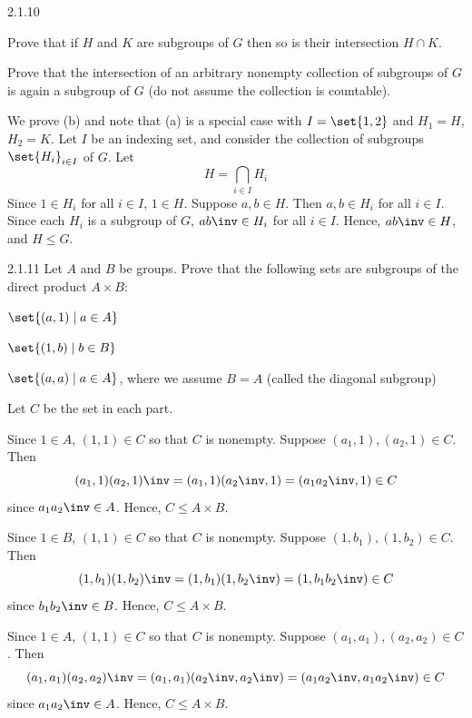 \begin{exercise}{2.1.10}
    \begin{subexercises}
        \item Prove that if $H$ and $K$ are subgroups of $G$ then so is their intersection $H \cap K$.
        \item Prove that the intersection of an arbitrary nonempty collection of subgroups of $G$ is again a subgroup of $G$ (do not assume the collection is countable).
    \end{subexercises}
\end{exercise}

\begin{sol}
    We prove (b) and note that (a) is a special case with $I = \set{1, 2}$ and $H_1 = H$, $H_2 = K$.
	Let $I$ be an indexing set, and consider the collection of subgroups $\set{ H_i }_{i \in I}$ of $G$.
	Let
    \[
    	H = \bigcap_{i \in I} H_i
    \]
    Since $1 \in H_i$ for all $i \in I$, $1 \in H$.
	Suppose $a, b \in H$.
	Then $a, b \in H_i$ for all $i \in I$.
	Since each $H_i$ is a subgroup of $G$, $ab\inv \in H_i$ for all $i \in I$.
	Hence, $ab\inv \in H$, and $H \leq G$.
\end{sol}

\begin{exercise}{2.1.11}
    Let $A$ and $B$ be groups.
	Prove that the following sets are subgroups of the direct product $A \times B$:
    \begin{subexercises}
        \item $\set{ (a, 1) \mid a \in A }$
        \item $\set{ (1, b) \mid b \in B }$
        \item $\set{ (a, a) \mid a \in A }$, where we assume $B = A$ (called the diagonal subgroup)
    \end{subexercises}
\end{exercise}

\begin{sol}
    Let $C$ be the set in each part.
    \begin{subexercises}
        \item Since $1 \in A$, $(1, 1) \in C$ so that $C$ is nonempty.
        Suppose $(a_1, 1), (a_2, 1) \in C$.
        Then
        \[
        	(a_1, 1)(a_2, 1)\inv = (a_1, 1)(a_2\inv, 1) = (a_1a_2\inv, 1) \in C
        \]
        since $a_1a_2\inv \in A$.
        Hence, $C \leq A \times B$.
        \item Since $1 \in B$, $(1, 1) \in C$ so that $C$ is nonempty.
        Suppose $(1, b_1), (1, b_2) \in C$.
        Then
        \[
        	(1, b_1)(1, b_2)\inv = (1, b_1)(1, b_2\inv) = (1, b_1b_2\inv) \in C
        \]
        since $b_1b_2\inv \in B$.
        Hence, $C \leq A \times B$.
        \item Since $1 \in A$, $(1, 1) \in C$ so that $C$ is nonempty.
        Suppose $(a_1, a_1), (a_2, a_2) \in C$.
        Then
        \[
        	(a_1, a_1)(a_2, a_2)\inv = (a_1, a_1)(a_2\inv, a_2\inv) = (a_1a_2\inv, a_1a_2\inv) \in C
        \]
        since $a_1a_2\inv \in A$.
	Hence, $C \leq A \times B$. \qedhere
    \end{subexercises}
\end{sol}

